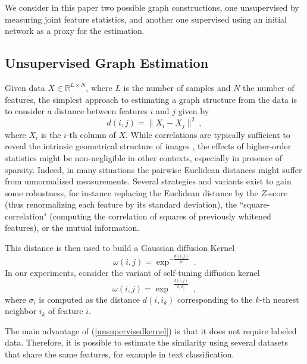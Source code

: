 \documentclass{article} %
\begin{document}
We consider in this paper two possible graph constructions, one unsupervised by measuring joint feature statistics, and another one supervised using an initial network as a proxy for the estimation.

\subsection{ Unsupervised Graph Estimation }

Given data $X \in \mathbb{R}^{L \times N}$, where $L$ is the number of samples and $N$ the number of features,
the simplest approach to estimating a graph structure from the data is to consider a distance between features $i$ and $j$ given by
$$d(i,j) = \| X_i - X_j \|^2~,$$
where $X_i$ is the $i$-th column of $X$. 
While correlations are typically sufficient to reveal the intrinsic geometrical structure of images \cite{roux2008learning}, 
 the effects of higher-order statistics might be non-negligible in other contexts, especially in presence of sparsity. 
Indeed, in many situations the pairwise Euclidean distances might suffer from unnormalized measurements. Several strategies and variants 
exist to gain some robustness, for instance replacing the Euclidean distance by the $Z$-score (thus renormalizing each feature by its standard
deviation), the ``square-correlation" (computing the correlation of squares of previously whitened features), or the mutual information.

This distance is then used to build a Gaussian diffusion Kernel \cite{belkin2001laplacian} 
\begin{equation}
\label{unsupervisedkernel}
\omega(i,j) = \exp^{-\frac{d(i,j)}{\sigma^2}}~.
\end{equation}
In our experiments, consider the variant of self-tuning diffusion kernel \cite{zelnik2004self}
$$\omega(i,j) = \exp^{-\frac{d(i,j)}{\sigma_i \sigma_j}}~,$$
where $\sigma_i$ is computed as the distance $d(i,i_{k})$ corresponding to the $k$-th nearest neighbor $i_{k}$ of feature $i$. 


The main advantage of (\ref{unsupervisedkernel}) is that it does not require labeled data. Therefore, it is possible to estimate 
the similarity using several datasets that share the same features, for example in text classification. 
\end{document}
